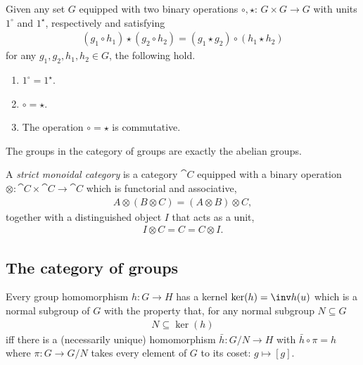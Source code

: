 \documentclass{article}
\begin{document}
\begin{proposition}[Awodey p. 78]
    Given any set $G$ equipped with two binary operations $\circ,\star$:
    $G\times G\to G$ with units $1^\circ$ and $1^\star$, respectively and
    satisfying
    \begin{align*}
        (g_1 \circ h_1)\star (g_2\circ h_2) = (g_1\star g_2) \circ (h_1\star h_2)
    \end{align*}
    for any $g_1, g_2, h_1, h_2\in G$, the following hold.
    \begin{enumerate}
        \item $1^\circ = 1^\star$.
        \item $\circ = \star$.
        \item The operation $\circ = \star$ is commutative.
    \end{enumerate}
\end{proposition}

\begin{corollary}[Awodey p. 79]
    The groups in the category of groups are exactly the abelian groups. 
\end{corollary}

\begin{definition}[Awodey p. 79]
    A \emph{strict monoidal category} is a category $\cat C$ equipped with a
    binary operation $\otimes:\cat C\times \cat C\to \cat C$ which is functorial
    and associative,
    \begin{align*}
        A\otimes(B\otimes C) = (A\otimes B)\otimes C,
    \end{align*}
    together with a distinguished object $I$ that acts as a unit,
    \begin{align*}
        I\otimes C = C = C \otimes I.
    \end{align*}
\end{definition}

\subsection{The category of groups}

\begin{theorem}[Awodey p. 83]
    Every group homomorphism $h:G\to H$ has a kernel $\ker(h)=\inv h(u)$
    which is a normal subgroup of $G$ with the property that, for any normal
    subgroup $N\subseteq G$ 
    \begin{align*}
        N\subseteq \ker(h)
    \end{align*}
    iff there is a (necessarily unique) homomorphism
    $\bar h:G/N\to H$ with $\bar h \circ \pi = h$ where 
    $\pi:G\to G/N$ takes every element of $G$ to its
    coset: $g\mapsto [g]$.
\end{theorem}
\end{document}
